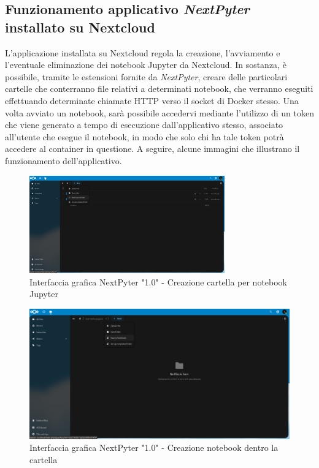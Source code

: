 \subsection{Funzionamento applicativo \textit{NextPyter} installato su Nextcloud}
L'applicazione installata su Nextcloud regola la creazione, l'avviamento e l'eventuale eliminazione dei notebook Jupyter da Nextcloud.
\newline
In sostanza, è possibile, tramite le estensioni fornite da \textit{NextPyter}, creare delle particolari cartelle che conterranno file relativi a determinati notebook, che verranno eseguiti effettuando determinate chiamate HTTP verso il socket di Docker stesso. 
\newline
Una volta avviato un notebook, sarà possibile accedervi mediante l'utilizzo di un token che viene generato a tempo di esecuzione dall'applicativo stesso, associato all'utente che esegue il notebook, in modo che solo chi ha tale token potrà accedere al container in questione.
\newline
A seguire, alcune immagini che illustrano il funzionamento dell'applicativo.
\newline
\begin{figure}[h]
    \centering
    \includegraphics[width=0.75\textwidth]{files/images/example-nextpyter-1-1.png}
    \caption{Interfaccia grafica NextPyter "1.0" - Creazione cartella per notebook Jupyter}
    \label{fig:1.0-example-1}
\end{figure}
\begin{figure}[h]
    \centering
    \includegraphics[width=1\textwidth]{files/images/example-nextpyter-1-2.png}
    \caption{Interfaccia grafica NextPyter "1.0" - Creazione notebook dentro la cartella}
    \label{fig:1.0-example-2}
\end{figure}
